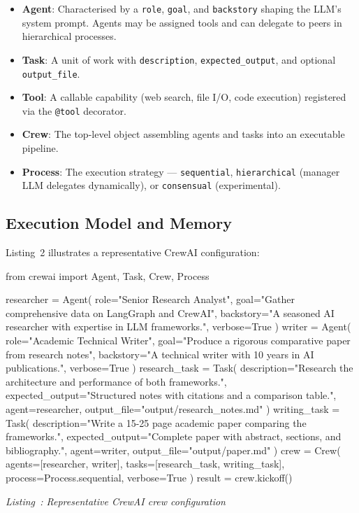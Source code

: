 \documentclass[12pt,a4paper]{article}
\newcounter{codelisting}
\newcommand{\codecaption}[1]{%
    \refstepcounter{codelisting}%
    \begin{center}\small\textit{Listing~\thecodelisting: #1}\end{center}}
\begin{document}
\begin{itemize}
    \item \textbf{Agent}: Characterised by a \texttt{role}, \texttt{goal}, and
          \texttt{backstory} shaping the LLM's system prompt. Agents may be
          assigned tools and can delegate to peers in hierarchical processes.

    \item \textbf{Task}: A unit of work with \texttt{description},
          \texttt{expected\_output}, and optional \texttt{output\_file}.

    \item \textbf{Tool}: A callable capability (web search, file I/O, code
          execution) registered via the \texttt{@tool} decorator.

    \item \textbf{Crew}: The top-level object assembling agents and tasks into
          an executable pipeline.

    \item \textbf{Process}: The execution strategy --- \texttt{sequential},
          \texttt{hierarchical} (manager LLM delegates dynamically), or
          \texttt{consensual} (experimental).
\end{itemize}

\subsection{Execution Model and Memory}

Listing~2 illustrates a representative CrewAI configuration:

\begin{CodeBlock}
from crewai import Agent, Task, Crew, Process

researcher = Agent(
    role="Senior Research Analyst",
    goal="Gather comprehensive data on LangGraph and CrewAI",
    backstory="A seasoned AI researcher with expertise in LLM frameworks.",
    verbose=True
)
writer = Agent(
    role="Academic Technical Writer",
    goal="Produce a rigorous comparative paper from research notes",
    backstory="A technical writer with 10 years in AI publications.",
    verbose=True
)
research_task = Task(
    description="Research the architecture and performance of both frameworks.",
    expected_output="Structured notes with citations and a comparison table.",
    agent=researcher,
    output_file="output/research_notes.md"
)
writing_task = Task(
    description="Write a 15-25 page academic paper comparing the frameworks.",
    expected_output="Complete paper with abstract, sections, and bibliography.",
    agent=writer,
    output_file="output/paper.md"
)
crew = Crew(
    agents=[researcher, writer],
    tasks=[research_task, writing_task],
    process=Process.sequential,
    verbose=True
)
result = crew.kickoff()
\end{CodeBlock}
\codecaption{Representative CrewAI crew configuration}\label{lst:crewai}
\end{document}
